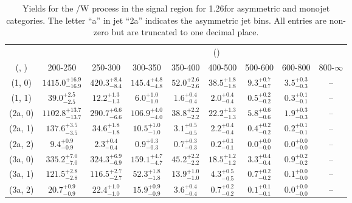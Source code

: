 \begin{table}[h!]
\tiny
\centering
\caption{Yields for the \ttbar/W process in the signal region for 1.26\ifb for asymmetric and monojet categories. The letter ``a'' in jet \eg ``2a''  indicates the asymmetric jet bins. All entries are non-zero but are truncated to one decimal place.\label{tab:yieldssep_ttw_sig_asym}}
\begin{tabular}
{ccccccccc}
	\hline\hline
&	& \multicolumn{8}{c}{\scalht (\gev)} \\ 
	 (\njet,  \nb) & 200-250 & 250-300 & 300-350 & 350-400 & 400-500 & 500-600 & 600-800 & 800-$\infty$ \\ [0.8ex] 
\hline
	(1, 0) & $1415.0^{+ 16.9 }_{- 16.9 }$ & $420.3^{+ 8.4 }_{- 8.4 }$ & $145.4^{+ 4.8 }_{- 4.8 }$ & $52.0^{+ 2.6 }_{- 2.6 }$ & $38.5^{+ 1.8 }_{- 1.8 }$ & $9.3^{+ 0.7 }_{- 0.7 }$ & $3.5^{+ 0.3 }_{- 0.3 }$ & -- \\[0.5ex] 
	(1, 1) & $39.0^{+ 2.5 }_{- 2.5 }$ & $12.2^{+ 1.3 }_{- 1.3 }$ & $6.0^{+ 1.0 }_{- 1.0 }$ & $1.6^{+ 0.4 }_{- 0.4 }$ & $2.0^{+ 0.4 }_{- 0.4 }$ & $0.5^{+ 0.2 }_{- 0.2 }$ & $0.3^{+ 0.1 }_{- 0.1 }$ & -- \\[0.5ex] 
	(2a, 0) & $1102.8^{+ 13.7 }_{- 13.7 }$ & $290.7^{+ 6.6 }_{- 6.6 }$ & $106.9^{+ 4.0 }_{- 4.0 }$ & $38.8^{+ 2.2 }_{- 2.2 }$ & $22.2^{+ 1.3 }_{- 1.3 }$ & $5.8^{+ 0.6 }_{- 0.6 }$ & $1.9^{+ 0.3 }_{- 0.3 }$ & -- \\[0.5ex] 
	(2a, 1) & $137.6^{+ 3.5 }_{- 3.5 }$ & $34.6^{+ 1.8 }_{- 1.8 }$ & $10.5^{+ 1.0 }_{- 1.0 }$ & $3.1^{+ 0.5 }_{- 0.5 }$ & $2.2^{+ 0.4 }_{- 0.4 }$ & $0.4^{+ 0.2 }_{- 0.2 }$ & $0.2^{+ 0.1 }_{- 0.1 }$ & -- \\[0.5ex] 
	(2a, 2) & $9.4^{+ 0.9 }_{- 0.9 }$ & $2.3^{+ 0.4 }_{- 0.4 }$ & $0.9^{+ 0.3 }_{- 0.3 }$ & $0.7^{+ 0.3 }_{- 0.3 }$ & $0.2^{+ 0.1 }_{- 0.1 }$ & $0.0^{+ 0.0 }_{- 0.0 }$ & $0.0^{+ 0.0 }_{- 0.0 }$ & -- \\[0.5ex] 
	(3a, 0) & $335.2^{+ 7.0 }_{- 7.0 }$ & $324.3^{+ 6.9 }_{- 6.9 }$ & $159.1^{+ 4.7 }_{- 4.7 }$ & $45.2^{+ 2.2 }_{- 2.2 }$ & $18.5^{+ 1.2 }_{- 1.2 }$ & $3.3^{+ 0.4 }_{- 0.4 }$ & $0.9^{+ 0.2 }_{- 0.2 }$ & -- \\[0.5ex] 
	(3a, 1) & $121.5^{+ 2.8 }_{- 2.8 }$ & $116.5^{+ 2.7 }_{- 2.7 }$ & $52.3^{+ 1.8 }_{- 1.8 }$ & $13.9^{+ 1.0 }_{- 1.0 }$ & $4.3^{+ 0.5 }_{- 0.5 }$ & $0.7^{+ 0.2 }_{- 0.2 }$ & $0.1^{+ 0.0 }_{- 0.0 }$ & -- \\[0.5ex] 
	(3a, 2) & $20.7^{+ 0.9 }_{- 0.9 }$ & $22.4^{+ 1.0 }_{- 1.0 }$ & $15.9^{+ 0.9 }_{- 0.9 }$ & $3.6^{+ 0.4 }_{- 0.4 }$ & $0.7^{+ 0.2 }_{- 0.2 }$ & $0.1^{+ 0.1 }_{- 0.1 }$ & $0.0^{+ 0.0 }_{- 0.0 }$ & -- \\[0.5ex] 

\end{tabular}
\end{table}
